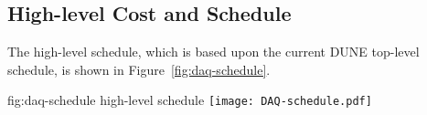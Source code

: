 
\subsection{High-level Cost and Schedule}
\label{sec:fd-daq-org-cs}

The high-level  schedule, which is based upon the current DUNE  top-level schedule, is shown in Figure~\ref{fig:daq-schedule}.

\begin{dunefigure}{fig:daq-schedule}
  { high-level schedule}
\texttt{[image: DAQ-schedule.pdf]}
\end{dunefigure}


